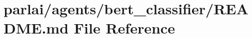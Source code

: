 \hypertarget{parlai_2agents_2bert__classifier_2README_8md}{}\section{parlai/agents/bert\+\_\+classifier/\+R\+E\+A\+D\+ME.md File Reference}
\label{parlai_2agents_2bert__classifier_2README_8md}

